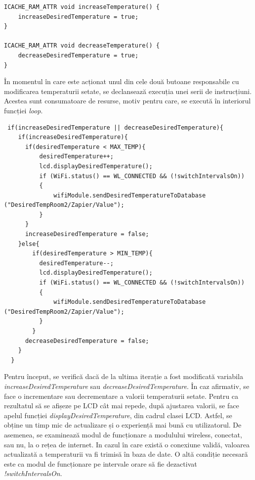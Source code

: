 \vspace{1em}

\begin{lstlisting}
ICACHE_RAM_ATTR void increaseTemperature() {
    increaseDesiredTemperature = true;
}

ICACHE_RAM_ATTR void decreaseTemperature() {
    decreaseDesiredTemperature = true;
}  
\end{lstlisting}

\vspace{2em}	

	În momentul în care este acționat unul din cele două butoane responsabile cu modificarea temperaturii setate, se declansează execuția unei serii de instrucțiuni. Acestea sunt consumatoare de resurse, motiv pentru care, se execută în interiorul funcției \textit{loop}. 


\vspace{1em}

\begin{lstlisting}
 if(increaseDesiredTemperature || decreaseDesiredTemperature){
    if(increaseDesiredTemperature){
      if(desiredTemperature < MAX_TEMP){
          desiredTemperature++;
          lcd.displayDesiredTemperature();
          if (WiFi.status() == WL_CONNECTED && (!switchIntervalsOn))
          {
              wifiModule.sendDesiredTemperatureToDatabase ("DesiredTempRoom2/Zapier/Value");
          }
      }
      increaseDesiredTemperature = false;
    }else{
        if(desiredTemperature > MIN_TEMP){
          desiredTemperature--;
          lcd.displayDesiredTemperature();
          if (WiFi.status() == WL_CONNECTED && (!switchIntervalsOn))
          {
              wifiModule.sendDesiredTemperatureToDatabase ("DesiredTempRoom2/Zapier/Value");
          }
        }
      decreaseDesiredTemperature = false;
    }
  }
\end{lstlisting}

\vspace{2em}	

	Pentru început, se verifică dacă de la ultima iterație a fost modificată variabila \textit{increaseDesiredTemperature} sau \textit{decreaseDesiredTemperature}. În caz afirmativ, se face o incrementare sau decrementare a valorii temperaturii setate. Pentru ca rezultatul să se afișeze pe LCD cât mai repede, după ajustarea valorii, se face apelul funcției \textit{displayDesiredTemperature}, din cadrul clasei LCD. Astfel, se obține un timp mic de actualizare și o experiență mai bună cu utilizatorul. De asemenea, se examinează modul de funcționare a modulului wireless, conectat, sau nu, la o rețea de internet. In cazul în care există o conexiune validă, valoarea actualizată a temperaturii va fi trimisă în baza de date. O altă condiție necesară este ca modul de funcționare pe intervale orare să fie dezactivat  \textit{!switchIntervalsOn}.

